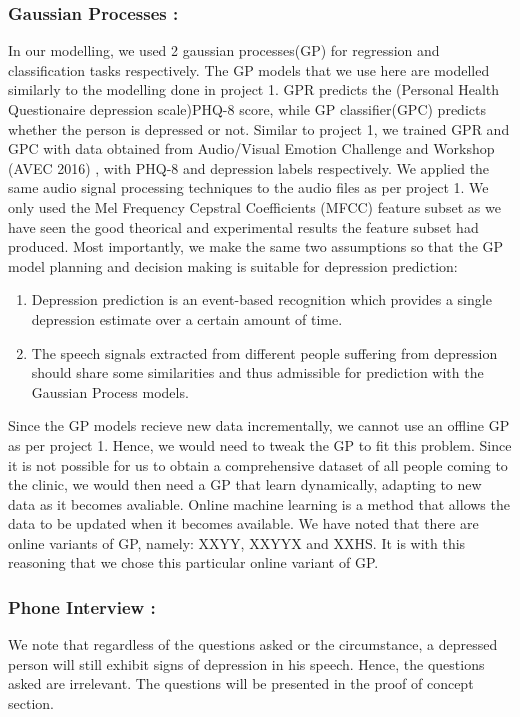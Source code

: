 \documentclass{article}
\begin{document}
	\subsubsection{Gaussian Processes :}
	In our modelling, we used 2 gaussian processes(GP) for regression and classification tasks respectively. 
	The GP models that we use here are modelled similarly to the modelling done in project 1. 
	GPR predicts the (Personal Health Questionaire depression scale)PHQ-8 score, while GP classifier(GPC) predicts whether the person is depressed or not. 
	Similar to project 1, we trained GPR and GPC with data obtained from Audio/Visual Emotion Challenge and Workshop (AVEC 2016) \cite{avec2016}, with PHQ-8 and depression labels respectively. 
	We applied the same audio signal processing techniques to the audio files as per project 1. 
	We only used the Mel Frequency Cepstral Coefficients (MFCC) feature subset as we have seen the good theorical and experimental results the feature subset had produced. 
	Most importantly, we make the same two assumptions so that the GP model planning and decision making is suitable for depression prediction:
	\begin{enumerate}
		\item Depression prediction is an event-based recognition which provides a single depression estimate over a certain amount of time. \cite{Valstar2016}
		\item The speech signals extracted from different people suffering from depression should share some similarities and thus admissible for prediction with the Gaussian Process models\cite{Cummins2015}.
	\end{enumerate}
	Since the GP models recieve new data incrementally, we cannot use an offline GP as per project 1. 
	Hence, we would need to tweak the GP to fit this problem. Since it is not possible for us to obtain a comprehensive dataset of all people coming to the clinic, we would then need a GP that learn dynamically, adapting to new data as it becomes avaliable. 
	Online machine learning is a method that allows the data to be updated when it becomes available. 
	We have noted that there are online variants of GP, namely: XXYY, XXYYX and XXHS. It is with this reasoning that we chose this particular online variant of GP. 
	
	\subsubsection{Phone Interview :}
	We note that regardless of the questions asked or the circumstance, a depressed person will still exhibit signs of depression in his speech\cite{jad2008}. 
	Hence, the questions asked are irrelevant. The questions will be presented in the proof of concept section.
\end{document}
